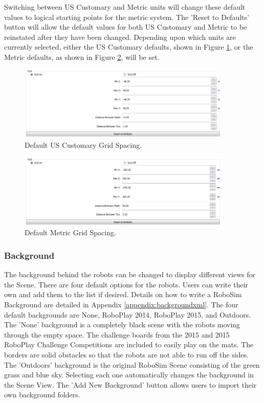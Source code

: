 \documentclass{article}
\begin{document}
Switching between US Customary and Metric units will change these default values
to logical starting points for the metric system.  The 'Reset to Defaults'
button will allow the default values for both US Customary and Metric to be
reinstated after they have been changed.  Depending upon which units are
currently selected, either the US Customary defaults, shown in Figure
\ref{fig:grid_us}, or the Metric defaults, as shown in Figure
\ref{fig:grid_metric}, will be set.
\begin{figure}[H]
	\begin{center}
		\includegraphics[width=4in]{pictures/gui_grid_us}
	\end{center}
	\caption{Default US Customary Grid Spacing.}
	\label{fig:grid_us}
\end{figure}
\begin{figure}[H]
	\begin{center}
		\includegraphics[width=4in]{pictures/gui_grid_si}
	\end{center}
	\caption{Default Metric Grid Spacing.}
	\label{fig:grid_metric}
\end{figure}

\subsubsection{Background}
The background behind the robots can be changed to display different views for
the Scene.  There are four default options for the robots.  Users can write
their own and add them to the list if desired.  Details on how to write a
RoboSim Background are detailed in Appendix \ref{appendix:backgroundxml}.  The
four default backgrounds are None, RoboPlay 2014, RoboPlay 2015, and Outdoors.
The 'None' background is a completely black scene with the robots moving through
the empty space.  The challenge boards from the 2015 and 2015 RoboPlay Challenge
Competitions are included to easily play on the mats.  The borders are solid
obstacles so that the robots are not able to run off the sides.  The 'Outdoors'
background is the original RoboSim Scene consisting of the green grass and blue
sky.  Selecting each one automatically changes the background in the Scene View.
The 'Add New Background' button allows users to import their own background
folders.
\end{document}
